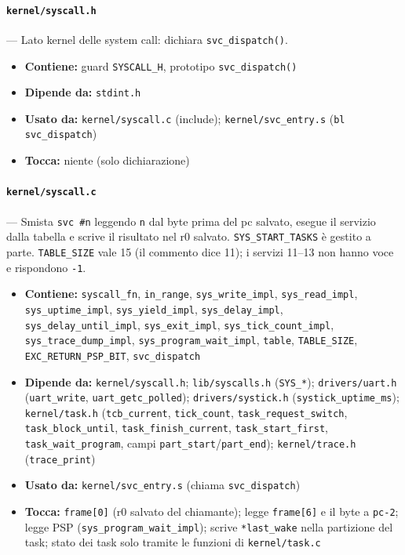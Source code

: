 \paragraph{\texttt{kernel/syscall.h}} --- Lato kernel delle system call: dichiara \texttt{svc\_dispatch()}.
\begin{itemize}
  \item \textbf{Contiene:} guard \texttt{SYSCALL\_H}, prototipo \texttt{svc\_dispatch()}
  \item \textbf{Dipende da:} \texttt{stdint.h}
  \item \textbf{Usato da:} \texttt{kernel/syscall.c} (include); \texttt{kernel/svc\_entry.s} (\texttt{bl svc\_dispatch})
  \item \textbf{Tocca:} niente (solo dichiarazione)
\end{itemize}

\paragraph{\texttt{kernel/syscall.c}} --- Smista \texttt{svc \#n} leggendo \texttt{n} dal byte prima del pc salvato, esegue il servizio dalla tabella e scrive il risultato nel r0 salvato. \texttt{SYS\_START\_TASKS} è gestito a parte. \texttt{TABLE\_SIZE} vale 15 (il commento dice 11); i servizi 11--13 non hanno voce e rispondono \texttt{-1}.
\begin{itemize}
  \item \textbf{Contiene:} \texttt{syscall\_fn}, \texttt{in\_range}, \texttt{sys\_write\_impl}, \texttt{sys\_read\_impl}, \texttt{sys\_uptime\_impl}, \texttt{sys\_yield\_impl}, \texttt{sys\_delay\_impl}, \texttt{sys\_delay\_until\_impl}, \texttt{sys\_exit\_impl}, \texttt{sys\_tick\_count\_impl}, \texttt{sys\_trace\_dump\_impl}, \texttt{sys\_program\_wait\_impl}, \texttt{table}, \texttt{TABLE\_SIZE}, \texttt{EXC\_RETURN\_PSP\_BIT}, \texttt{svc\_dispatch}
  \item \textbf{Dipende da:} \texttt{kernel/syscall.h}; \texttt{lib/syscalls.h} (\texttt{SYS\_*}); \texttt{drivers/uart.h} (\texttt{uart\_write}, \texttt{uart\_getc\_polled}); \texttt{drivers/systick.h} (\texttt{systick\_uptime\_ms}); \texttt{kernel/task.h} (\texttt{tcb\_current}, \texttt{tick\_count}, \texttt{task\_request\_switch}, \texttt{task\_block\_until}, \texttt{task\_finish\_current}, \texttt{task\_start\_first}, \texttt{task\_wait\_program}, campi \texttt{part\_start}/\texttt{part\_end}); \texttt{kernel/trace.h} (\texttt{trace\_print})
  \item \textbf{Usato da:} \texttt{kernel/svc\_entry.s} (chiama \texttt{svc\_dispatch})
  \item \textbf{Tocca:} \texttt{frame[0]} (r0 salvato del chiamante); legge \texttt{frame[6]} e il byte a \texttt{pc-2}; legge PSP (\texttt{sys\_program\_wait\_impl}); scrive \texttt{*last\_wake} nella partizione del task; stato dei task solo tramite le funzioni di \texttt{kernel/task.c}
\end{itemize}

